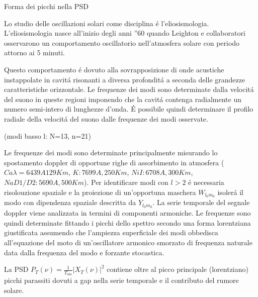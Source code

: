 \documentclass[10pt,xcolor={usenames},fleqn,mathserif,serif]{beamer}
\begin{document}
\begin{wordonframe}{Forma dei picchi nella PSD}

Lo studio delle oscillazioni solari come disciplina \'e l'eliosismologia. L'eliosismologia nasce all'inizio degli anni ''60 quando Leighton e collaboratori osservarono un comportamento oscillatorio nell'atmosfera solare con periodo attorno ai 5 minuti.

Questo comportamento \'e dovuto alla sovrapposizione di onde acustiche instappolate in cavit\'a risonanti a diversa profondit\'a a seconda delle grandezze caratteristiche orizzontale. Le frequenze dei modi sono determinate dalla velocit\'a del suono in queste regioni imponendo che  la cavit\'a contenga radialmente un numero semi-intero di lunghezze d'onda. \'E possibile quindi determinare il profilo radiale della velocit\'a del suono dalle frequenze dei modi osservate.


(modi basso l: N=13, n=21)

Le frequenze dei modi sono determinate principalmente misurando lo spostamento doppler di opportune righe di assorbimento in atmosfera ($Ca \lambda=6439 A 129 Km$, $K: 7699 A, 250Km$, $Ni I: 6708 A,300 Km$, $Na D1/D2: 5690 A, 500 Km$). Per identificare modi con $l>2$ \'e necessaria risolouzione spaziale e la proiezione di un'opportuna maschera $W_{l_0m_0}$ isoler\'a il modo con dipendenza spaziale descritta da $Y_{l_0m_0}$. La serie temporale del segnale doppler viene analizzata in termini di componenti armoniche. Le frequenze sono quindi determinate fittando i picchi dello spettro secondo una forma lorentziana  giustificata assumendo che l'ampiezza superficiale dei modi obbedisca all'equazione del moto di un'oscillatore armonico smorzato di frequenza naturale data dalla frequenza del modo e forzante stocastica.

La PSD $P_T(\nu)=\frac{1}{T_{obs}}|X_T(\nu)|^2$ contiene oltre al picco principale (lorentziano) picchi parassiti dovuti a gap nella serie temporale e il contributo del rumore solare.

\end{wordonframe}
\end{document}
